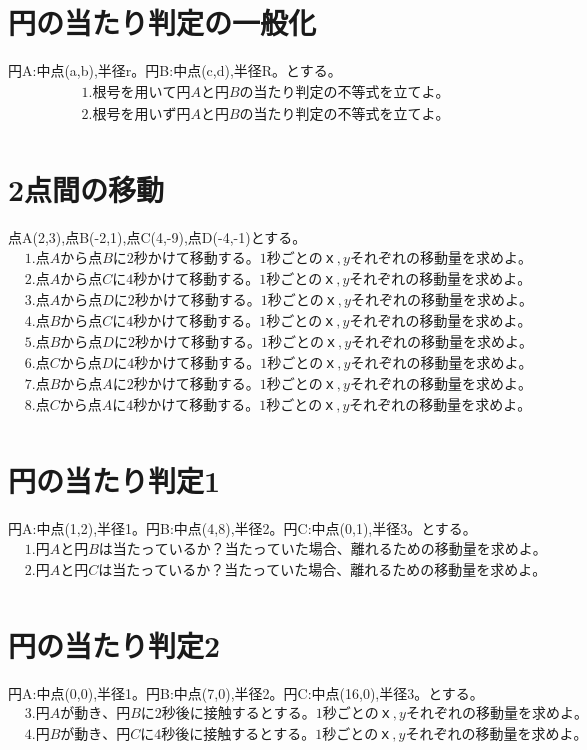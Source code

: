 \documentclass[paper=b4j,landscape,twocolumn,fleqn]{jlreq}
\begin{document}
\section{円の当たり判定の一般化}
円A:中点(a,b),半径r。円B:中点(c,d),半径R。とする。
\begin{align*}
　&1.　根号を用いて円Aと円Bの当たり判定の不等式を立てよ。\\[1em]
　&2.　根号を用いず円Aと円Bの当たり判定の不等式を立てよ。\\[1em]
\end{align*}

\newpage
\section{2点間の移動}
点A(2,3),点B(-2,1),点C(4,-9),点D(-4,-1)とする。
\begin{align*}
　&1.　点Aから点Bに2秒かけて移動する。1秒ごとのｘ,yそれぞれの移動量を求めよ。\\[1em]
　&2.　点Aから点Cに4秒かけて移動する。1秒ごとのｘ,yそれぞれの移動量を求めよ。\\[1em]
　&3.　点Aから点Dに2秒かけて移動する。1秒ごとのｘ,yそれぞれの移動量を求めよ。\\[1em]
　&4.　点Bから点Cに4秒かけて移動する。1秒ごとのｘ,yそれぞれの移動量を求めよ。\\[1em]
　&5.　点Bから点Dに2秒かけて移動する。1秒ごとのｘ,yそれぞれの移動量を求めよ。\\[1em]
　&6.　点Cから点Dに4秒かけて移動する。1秒ごとのｘ,yそれぞれの移動量を求めよ。\\[1em]
　&7.　点Bから点Aに2秒かけて移動する。1秒ごとのｘ,yそれぞれの移動量を求めよ。\\[1em]
　&8.　点Cから点Aに4秒かけて移動する。1秒ごとのｘ,yそれぞれの移動量を求めよ。\\[1em]
\end{align*}
\section{円の当たり判定1}
円A:中点(1,2),半径1。円B:中点(4,8),半径2。円C:中点(0,1),半径3。とする。
\begin{align*}
　&1.　円Aと円Bは当たっているか？　当たっていた場合、離れるための移動量を求めよ。\\[1em]
　&2.　円Aと円Cは当たっているか？　当たっていた場合、離れるための移動量を求めよ。\\[1em]
\end{align*}
\section{円の当たり判定2}
円A:中点(0,0),半径1。円B:中点(7,0),半径2。円C:中点(16,0),半径3。とする。
\begin{align*}
　&3.　円Aが動き、円Bに2秒後に接触するとする。1秒ごとのｘ,yそれぞれの移動量を求めよ。\\[1em]
　&4.　円Bが動き、円Cに4秒後に接触するとする。1秒ごとのｘ,yそれぞれの移動量を求めよ。\\[1em]
\end{align*}
\end{document}
